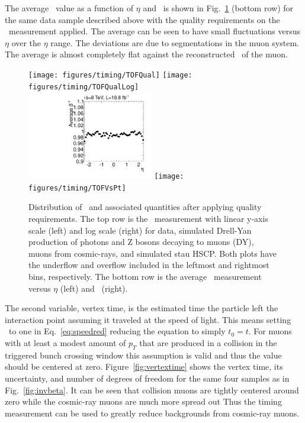 The average \invbeta\ value as a function of $\eta$ and \pt\ is shown in Fig.~\ref{fig:invbetaQual} (bottom row) for the same data sample described above
with the quality requirements on the \invbeta\ measurement applied.
The average can be seen to have small fluctuations versus $\eta$ over the $\eta$ range.
The deviations are due to segmentations in the muon system.
The average is almost completely flat against the reconstructed \pt\ of the muon.

\begin{figure}
  \begin{center}
      \texttt{[image: figures/timing/TOFQual]}
      \texttt{[image: figures/timing/TOFQualLog]} \\
      \includegraphics[width=0.49\textwidth]{figures/timing/TOFVsEta}
      \texttt{[image: figures/timing/TOFVsPt]} \\
      \caption[Distribution of \invbeta\ and associated quantities after applying quality requirements.]
      {Distribution of \invbeta\ and associated quantities after applying quality requirements. 
The top row is the \invbeta\ measurement with linear y-axis scale (left) and log scale (right) for data,
simulated Drell-Yan production of photons and Z bosons decaying to muons (DY), muons from cosmic-rays, and simulated stau HSCP.
Both plots have the underflow and overflow included in the leftmost and rightmost bins, respectively.
The bottom row is the average \invbeta\ measurement versus $\eta$ (left) and \pt\ (right).
        }
      \label{fig:invbetaQual}
  \end{center}
\end{figure}

The second variable, vertex time, is the estimated time the particle 
left the interaction point assuming it traveled at the speed of light.
This means setting \invbeta\ to one in Eq.~\ref{eq:speedred} reducing the equation to simply $t_0 = t$. 
For muons with at least a modest amount of $p_T$ that are produced in a collision in the triggered bunch crossing window this assumption is valid and thus the
value should be centered at zero. Figure~\ref{fig:vertextime} shows the vertex time, its uncertainty, and number of degrees of freedom
for the same four samples as in Fig.~\ref{fig:invbeta}. It can be seen that collision muons are tightly centered around zero while the cosmic-ray muons
are much more spread out Thus the timing measurement can be used to greatly reduce backgrounds from cosmic-ray muons. 

